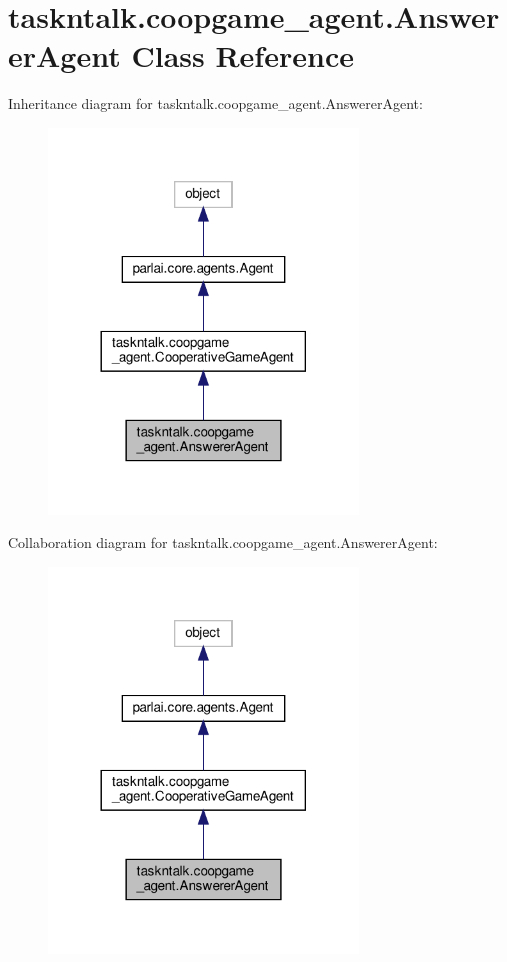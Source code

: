 \hypertarget{classtaskntalk_1_1coopgame__agent_1_1AnswererAgent}{}\section{taskntalk.\+coopgame\+\_\+agent.\+Answerer\+Agent Class Reference}
\label{classtaskntalk_1_1coopgame__agent_1_1AnswererAgent}


Inheritance diagram for taskntalk.\+coopgame\+\_\+agent.\+Answerer\+Agent\+:
\nopagebreak
\begin{figure}[H]
\begin{center}
\leavevmode
\includegraphics[width=233pt]{classtaskntalk_1_1coopgame__agent_1_1AnswererAgent__inherit__graph}
\end{center}
\end{figure}


Collaboration diagram for taskntalk.\+coopgame\+\_\+agent.\+Answerer\+Agent\+:
\nopagebreak
\begin{figure}[H]
\begin{center}
\leavevmode
\includegraphics[width=233pt]{classtaskntalk_1_1coopgame__agent_1_1AnswererAgent__coll__graph}
\end{center}
\end{figure}
